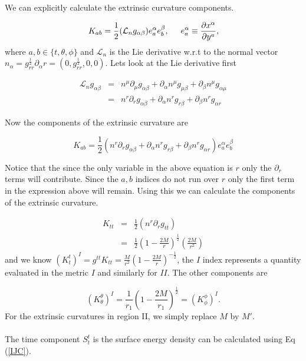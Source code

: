 \documentclass[aps,showpacs,onecolumn,floats,prd,superscriptaddress,nofootinbib]{revtex4-1}
\begin{document}
We can explicitly calculate the extrinsic curvature components.

\begin{equation}
	K_{ab} = \frac{1}{2} (\mathcal{L}_n g_{\alpha \beta}) e^\alpha_a e^\beta_b, \hspace{5mm} e^\alpha_a \equiv \frac{\partial x^\alpha}{\partial y^a},
\end{equation}
where $a,b \in \{t,\theta, \phi \}$ and $\mathcal{L}_n$ is the Lie derivative w.r.t to the normal vector $n_\alpha = g_{rr}^{\frac{1}{2}} \partial_\alpha r = (0, g_{rr}^{\frac{1}{2}}, 0 , 0)$. Lets look at the Lie derivative first

\begin{eqnarray}
	\mathcal{L}_n g_{\alpha \beta} & = & n^\mu \partial_\mu g_{\alpha \beta} + \partial_\alpha n^\mu g_{\mu \beta} + \partial_\beta n^\mu g_{\alpha \mu}	\nonumber	\\
	& = & n^r \partial_r g_{\alpha \beta} + \partial_\alpha n^r g_{r \beta} + \partial_\beta n^r g_{\alpha r}	
\end{eqnarray}

Now the components of the extrinsic curvature are

\begin{equation}
	K_{ab} = \frac{1}{2} (n^r \partial_r g_{\alpha \beta} + \partial_\alpha n^r g_{r \beta} + \partial_\beta n^r g_{\alpha r}) e^\alpha_a e^\beta_b	\label{Ecuv}
\end{equation}

Notice that the since the only variable in the above equation is $r$ only the $\partial_r$ terms will contribute. Since the $a,b$ indices do not run over $r$ only the first term in the expression above will remain. Using this we can calculate the components of the extrinsic curvature. 

\begin{eqnarray}
	K_{tt} & = & \frac{1}{2} (n^r \partial_r g_{tt}) 	\nonumber	\\
	& = & \frac{1}{2} \left( 1 - \frac{2M}{r} \right)^\frac{1}{2}  \left( \frac{2M}{r^2} \right)
\end{eqnarray}
and we know $(K^t_t)^{I} = g^{tt}K_{tt} = \frac{M}{r^2} \left( 1 - \frac{2M}{r} \right)^{-\frac{1}{2}}$, the $I$ index represents a quantity evaluated in the metric $I$ and similarly for $II$. The other components are 

\begin{equation}
	(K^\theta_\theta)^{I} = \frac{1}{r_1} \left( 1 - \frac{2M}{r_1} \right)^\frac{1}{2} = (K^\phi_\phi)^{I}.
\end{equation}
For the extrinsic curvatures in region II, we simply replace $M$ by $M'$.
\\
\\
The time component $S^t_t$ is the surface energy density can be calculated using Eq (\ref{IJC}).
\end{document}
